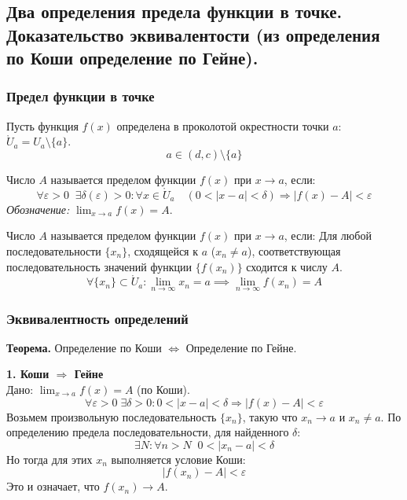 \subsection{Два определения предела функции в точке. Доказательство эквивалентости (из определения по Коши определение по Гейне).}

\subsubsection*{Предел функции в точке}

Пусть функция $f(x)$ определена в проколотой окрестности точки $a$: $\mathring U_a = U_a \setminus \{a\}$.
\[ a \in (d, c) \setminus \{a\} \]

\begin{tcolorbox}[title=Определение 1 (по Коши / на языке $\varepsilon - \delta$)]
	Число $A$ называется пределом функции $f(x)$ при $x \to a$, если:
	\[ \forall \varepsilon > 0\;\; \exists \delta(\varepsilon) > 0: \forall x \in \mathring U_a \quad (0 < |x-a| < \delta) \Rightarrow |f(x) - A| < \varepsilon \]
	\textit{Обозначение:} $\lim_{x \to a} f(x) = A$.
\end{tcolorbox}

\begin{tcolorbox}[title=Определение 2 (по Гейне / на языке последовательностей)]
	Число $A$ называется пределом функции $f(x)$ при $x \to a$, если:
	Для любой последовательности $\{x_n\}$, сходящейся к $a$ ($x_n \neq a$), соответствующая последовательность значений функции $\{f(x_n)\}$ сходится к числу $A$.
	\[ \forall \{x_n\} \subset \mathring U_a: \lim_{n\to\infty} x_n = a \implies \lim_{n\to\infty} f(x_n) = A \]
\end{tcolorbox}


\subsubsection*{Эквивалентность определений}
\begin{tcolorbox}
	\textbf{Теорема.} Определение по Коши $\Leftrightarrow$ Определение по Гейне.
\end{tcolorbox}

\begin{tcolorbox}[title=Доказательство]
	\textbf{1. Коши $\Rightarrow$ Гейне} \\
	Дано: $\lim_{x\to a} f(x) = A$ (по Коши).
	\[ \forall \varepsilon > 0\; \exists \delta > 0: 0 < |x-a| < \delta \Rightarrow |f(x) - A| < \varepsilon \]
	Возьмем произвольную последовательность $\{x_n\}$, такую что $x_n \to a$ и $x_n \neq a$.
	По определению предела последовательности, для найденного $\delta$:
	\[ \exists N: \forall n > N \;\; 0 < |x_n - a| < \delta \]
	Но тогда для этих $x_n$ выполняется условие Коши:
	\[ |f(x_n) - A| < \varepsilon \]
	Это и означает, что $f(x_n) \to A$.
\end{tcolorbox}
